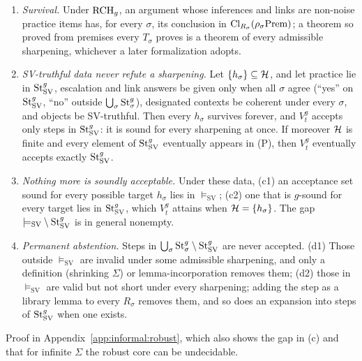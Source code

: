 \begin{theorem}\label{thm:informal:robust}
\begin{enumerate}[label=(\alph*)]
\item \emph{Survival.} Under $\mathrm{RCH}_g$, an argument whose inferences and links are non-noise practice items has, for every $\sigma$, its conclusion in $\mathrm{Cl}_{R_\sigma}(\rho_\sigma\mathrm{Prem})$; a theorem so proved from premises every $T_\sigma$ proves is a theorem of every admissible sharpening, whichever a later formalization adopts.
\item \emph{SV-truthful data never refute a sharpening.} Let $\{h_\sigma\}\subseteq\mathcal{H}$, and let practice lie in $\mathrm{St}^{g}_{\mathrm{SV}}$, escalation and link answers be given only when all $\sigma$ agree (``yes'' on $\mathrm{St}^{g}_{\mathrm{SV}}$, ``no'' outside $\bigcup_\sigma\mathrm{St}^{g}_{\sigma}$), designated contexts be coherent under every $\sigma$, and objects be SV-truthful. Then every $h_\sigma$ survives forever, and $V^g_t$ accepts only steps in $\mathrm{St}^{g}_{\mathrm{SV}}$: it is sound for every sharpening at once. If moreover $\mathcal{H}$ is finite and every element of $\mathrm{St}^{g}_{\mathrm{SV}}$ eventually appears in (P), then $V^g_t$ eventually accepts exactly $\mathrm{St}^{g}_{\mathrm{SV}}$.
\item \emph{Nothing more is soundly acceptable.} Under these data, (c1) an acceptance set sound for every possible target $h_\sigma$ lies in ${\models_{\mathrm{SV}}}$; (c2) one that is $g$-sound for every target lies in $\mathrm{St}^{g}_{\mathrm{SV}}$, which $V^g_t$ attains when $\mathcal{H}=\{h_\sigma\}$. The gap ${\models_{\mathrm{SV}}}\setminus\mathrm{St}^{g}_{\mathrm{SV}}$ is in general nonempty.
\item \emph{Permanent abstention.} Steps in $\bigcup_\sigma\mathrm{St}^{g}_{\sigma}\setminus\mathrm{St}^{g}_{\mathrm{SV}}$ are never accepted. (d1) Those outside ${\models_{\mathrm{SV}}}$ are invalid under some admissible sharpening, and only a definition (shrinking $\Sigma$) or lemma-incorporation removes them; (d2) those in ${\models_{\mathrm{SV}}}$ are valid but not short under every sharpening; adding the step as a library lemma to every $R_\sigma$ removes them, and so does an expansion into steps of $\mathrm{St}^{g}_{\mathrm{SV}}$ when one exists.
\end{enumerate}
\end{theorem}

Proof in Appendix~\ref{app:informal:robust}, which also shows the gap in (c) and that for infinite $\Sigma$ the robust core can be undecidable.

